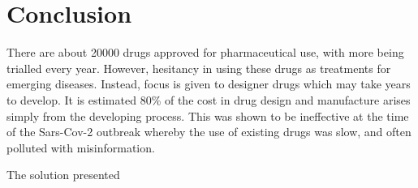 \chapter{Conclusion}


\graphicspath{{Chapter6/Figs/Vector/}{Chapter6/Figs/}}




There are about 20000 drugs approved for pharmaceutical use, with more being trialled every year. However, hesitancy in using these drugs as treatments for emerging diseases. Instead, focus is given to designer drugs which may take years to develop. It is estimated 80\% of the cost in drug design and manufacture arises simply from the developing process. This was shown to be ineffective at the time of the Sars-Cov-2 outbreak whereby the use of existing drugs was slow, and often polluted with misinformation.

The solution presented